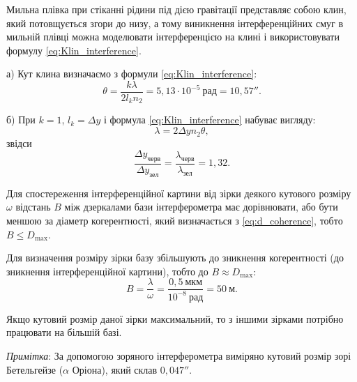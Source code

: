 \begin{solutionexample}[height fill=true]

	Мильна плівка при стіканні рідини під дією гравітації представляє собою клин, який потовщується згори до низу, а тому виникнення інтерференційних смуг в мильній плівці можна моделювати інтерференцією на клині і використовувати формулу \eqref{eq:Klin_interference}.

	а) Кут клина визначаємо з формули \eqref{eq:Klin_interference}:
	\begin{equation*}
		\theta = \frac{k\lambda}{2l_kn_2} = 5,13\cdot 10^{-5}\ \text{рад} = 10,57''.
	\end{equation*}

	б) При $k = 1$, $l_k = \Delta y$ і формула \eqref{eq:Klin_interference} набуває вигляду:
	\begin{equation*}
		\lambda = 2\Delta y n_2\theta,
	\end{equation*}
	звідси
	\begin{equation*}
		\frac{\Delta y_\text{черв}}{\Delta y_\text{зел}} = \frac{\lambda_\text{черв}}{\lambda_\text{зел}} = 1,32.
	\end{equation*}
\end{solutionexample}



\begin{solutionexample}[height fill=true]


	Для спостереження інтерференційної картини від зірки деякого кутового
	розміру $\omega$ відстань $B$ між дзеркалами бази інтерферометра має дорівнювати, або бути
	меншою за діаметр когерентності, який визначається з \eqref{eq:d_coherence}, тобто $ B \le D_{\max} $.

	Для визначення розміру зірки базу збільшують до зникнення когерентності (до зникнення інтерференційної картини), тобто до $ B \approx D_{\max} $:
	\begin{equation*}
		B = \frac{\lambda}{\omega} = \frac{0,5\ \text{мкм}}{10^{-8}\ \text{рад}} = 50 \ \text{м}.
	\end{equation*}

	Якщо кутовий розмір даної зірки максимальний, то з іншими зірками
	потрібно працювати на більшій базі.

	\medskip

	\emph{Примітка}: За допомогою зоряного інтерферометра виміряно кутовий розмір зорі Бетельгейзе ($\alpha$ Оріона), який склав $0,047''$.
\end{solutionexample}


